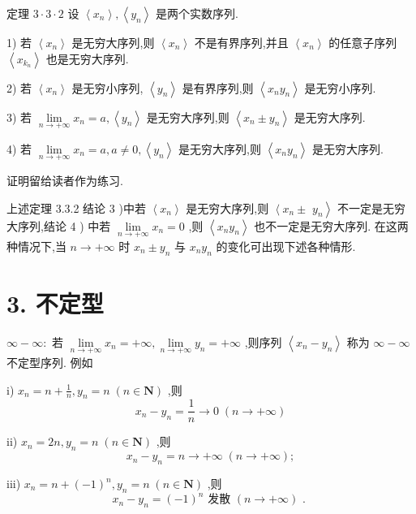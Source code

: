 定理 $3 \cdot  3 \cdot  2$ 设 $\left\langle  {x}_{n}\right\rangle  ,\left\langle  {y}_{n}\right\rangle$ 是两个实数序列.

1) 若 $\left\langle  {x}_{n}\right\rangle$ 是无穷大序列,则 $\left\langle  {x}_{n}\right\rangle$ 不是有界序列,并且 $\left\langle  {x}_{n}\right\rangle$ 的任意子序列 $\left\langle  {x}_{{k}_{n}}\right\rangle$ 也是无穷大序列.

2) 若 $\left\langle  {x}_{n}\right\rangle$ 是无穷小序列, $\left\langle  {y}_{n}\right\rangle$ 是有界序列,则 $\left\langle  {{x}_{n}{y}_{n}}\right\rangle$ 是无穷小序列.

3) 若 $\mathop{\lim }\limits_{{n \rightarrow   + \infty }}{x}_{n} = a,\left\langle  {y}_{n}\right\rangle$ 是无穷大序列,则 $\left\langle  {{x}_{n} \pm  {y}_{n}}\right\rangle$ 是无穷大序列.

4) 若 $\mathop{\lim }\limits_{{n \rightarrow   + \infty }}{x}_{n} = a,a \neq  0,\left\langle  {y}_{n}\right\rangle$ 是无穷大序列,则 $\left\langle  {{x}_{n}{y}_{n}}\right\rangle$ 是无穷大序列.

证明留给读者作为练习.

上述定理 3.3.2 结论 3 )中若 $\left\langle  {x}_{n}\right\rangle$ 是无穷大序列,则 $\left\langle  {{x}_{n} \pm  }\right.$  $\left. {y}_{n}\right\rangle$ 不一定是无穷大序列,结论 4 ) 中若 $\mathop{\lim }\limits_{{n \rightarrow   + \infty }}{x}_{n} = 0$ ,则 $\left\langle  {{x}_{n}{y}_{n}}\right\rangle$ 也不一定是无穷大序列. 在这两种情况下,当 $n \rightarrow   + \infty$ 时 ${x}_{n} \pm  {y}_{n}$ 与 ${x}_{n}{y}_{n}$ 的变化可出现下述各种情形.

\section*{3. 不定型}

$\infty  - \infty  :$ 若 $\mathop{\lim }\limits_{{n \rightarrow   + \infty }}{x}_{n} =  + \infty ,\mathop{\lim }\limits_{{n \rightarrow   + \infty }}{y}_{n} =  + \infty$ ,则序列 $\left\langle  {{x}_{n} - {y}_{n}}\right\rangle$ 称为 $\infty  - \infty$ 不定型序列. 例如

i) ${x}_{n} = n + \frac{1}{n},{y}_{n} = n\;\left( {n \in  \mathbf{N}}\right)$ ,则
$${x}_{n} - {y}_{n} = \frac{1}{n} \rightarrow  0\;\left( {n \rightarrow   + \infty }\right)$$

ii) ${x}_{n} = {2n},{y}_{n} = n\;\left( {n \in  \mathbf{N}}\right)$ ,则
$${x}_{n} - {y}_{n} = n \rightarrow   + \infty \;\left( {n \rightarrow   + \infty }\right) ;$$

iii) ${x}_{n} = n + {\left( -1\right) }^{n},{y}_{n} = n\;\left( {n \in  \mathbf{N}}\right)$ ,则
$${x}_{n} - {y}_{n} = {\left( -1\right) }^{n}\text{ 发散 }\left( {n \rightarrow   + \infty }\right) \text{ . }$$

